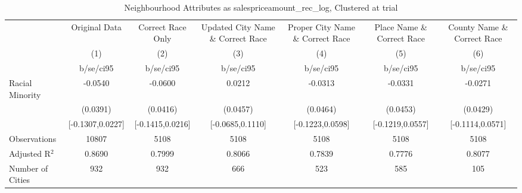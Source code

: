 \documentclass{article}
\begin{document}
\begin{table}[htbp]\centering
\def\sym#1{\ifmmode^{#1}\else\(^{#1}\)\fi}
\caption{Neighbourhood Attributes as salespriceamount\_rec\_log, Clustered at trial}
\begin{tabular}{l*{6}{c}}
\toprule
                    &\multicolumn{1}{c}{Original Data}&\multicolumn{1}{c}{Correct Race Only}&\multicolumn{1}{c}{Updated City Name \& Correct Race}&\multicolumn{1}{c}{Proper City Name \& Correct Race}&\multicolumn{1}{c}{Place Name \& Correct Race}&\multicolumn{1}{c}{County Name \& Correct Race}\\\cmidrule(lr){2-2}\cmidrule(lr){3-3}\cmidrule(lr){4-4}\cmidrule(lr){5-5}\cmidrule(lr){6-6}\cmidrule(lr){7-7}
                    &\multicolumn{1}{c}{(1)}   &\multicolumn{1}{c}{(2)}   &\multicolumn{1}{c}{(3)}   &\multicolumn{1}{c}{(4)}   &\multicolumn{1}{c}{(5)}   &\multicolumn{1}{c}{(6)}   \\
                    &   b/se/ci95   &   b/se/ci95   &   b/se/ci95   &   b/se/ci95   &   b/se/ci95   &   b/se/ci95   \\
\midrule
Racial Minority     &     -0.0540   &     -0.0600   &      0.0212   &     -0.0313   &     -0.0331   &     -0.0271   \\
                    &    (0.0391)   &    (0.0416)   &    (0.0457)   &    (0.0464)   &    (0.0453)   &    (0.0429)   \\
                    &[-0.1307,0.0227]   &[-0.1415,0.0216]   &[-0.0685,0.1110]   &[-0.1223,0.0598]   &[-0.1219,0.0557]   &[-0.1114,0.0571]   \\
\midrule
Observations        &       10807   &        5108   &        5108   &        5108   &        5108   &        5108   \\
Adjusted R$^2$      &      0.8690   &      0.7999   &      0.8066   &      0.7839   &      0.7776   &      0.8077   \\
Number of Cities    &         932   &         932   &         666   &         523   &         585   &         105   \\
\bottomrule
\end{tabular}
\end{table}
\end{document}
